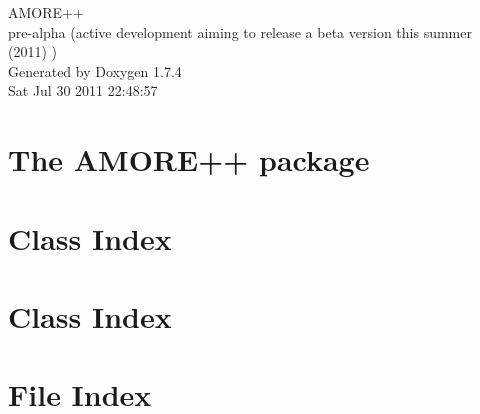 \documentclass[a4paper]{book}
\begin{document}
\hypersetup{pageanchor=false}
\begin{titlepage}
\vspace*{7cm}
\begin{center}
{\Large AMORE++ \\[1ex]\large pre-\/alpha (active development aiming to release a beta version this summer (2011) ) }\\
\vspace*{1cm}
{\large Generated by Doxygen 1.7.4}\\
\vspace*{0.5cm}
{\small Sat Jul 30 2011 22:48:57}\\
\end{center}
\end{titlepage}
\clearemptydoublepage
{}
\tableofcontents
\clearemptydoublepage
{}
\hypersetup{pageanchor=true}
\chapter{The AMORE++ package}
\label{index}\hypertarget{index}{}
\chapter{Class Index}

\chapter{Class Index}

\chapter{File Index}

\end{document}

